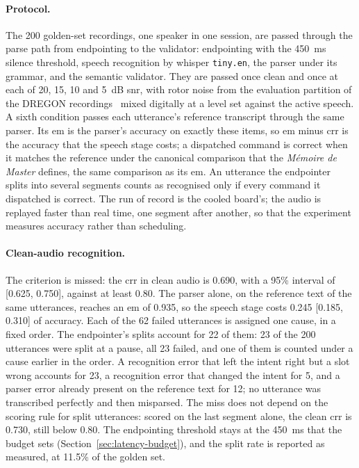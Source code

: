 \paragraph{Protocol.} The 200 golden-set recordings, one speaker in one session, are passed through
the parse path from endpointing to the validator: endpointing with the 450~ms silence threshold,
speech recognition by whisper \texttt{tiny.en}, the parser under its grammar, and the semantic
validator. They are passed once clean and once at each of 20, 15, 10 and 5~dB \gls{snr}, with rotor
noise from the evaluation partition of the DREGON recordings~\cite{dregon} mixed digitally at a
level set against the active speech. A sixth condition passes each utterance's reference transcript
through the same parser. Its \gls{em} is the parser's accuracy on exactly these items, so \gls{em}
minus \gls{crr} is the accuracy that the speech stage costs; a dispatched command is correct when
it matches the reference under the canonical comparison that the \emph{M\'emoire de Master} defines,
the same comparison as its \gls{em}. An utterance the endpointer splits into
several segments counts as recognised only if every command it dispatched is correct. The run of
record is the cooled board's; the audio is replayed faster than real time, one segment after
another, so that the experiment measures accuracy rather than scheduling.



\paragraph{Clean-audio recognition.} The criterion is missed: the \gls{crr} in clean audio is 0.690,
with a 95\% interval of [0.625, 0.750], against at least 0.80. The parser alone, on the reference
text of the same utterances, reaches an \gls{em} of 0.935, so the speech stage costs 0.245 [0.185,
0.310] of accuracy. Each of the 62 failed utterances is assigned one cause, in a fixed order. The
endpointer's splits account for 22 of them: 23 of the 200 utterances were split at a pause, all 23
failed, and one of them is counted under a cause earlier in the order. A recognition error that left
the intent right but a slot wrong accounts for 23, a recognition error that changed the intent for
5, and a parser error already present on the reference text for 12; no utterance was transcribed
perfectly and then misparsed. The miss does not depend on the scoring rule for split utterances:
scored on the last segment alone, the clean \gls{crr} is 0.730, still below 0.80. The endpointing
threshold stays at the 450~ms that the budget sets (Section~\ref{sec:latency-budget}), and the split
rate is reported as measured, at 11.5\% of the golden set.

